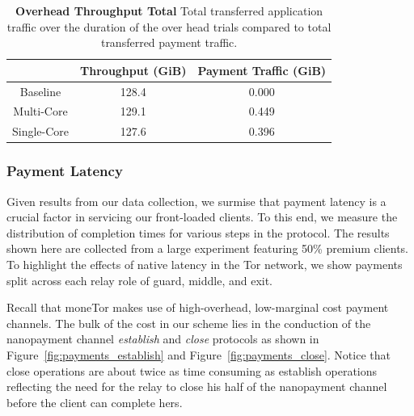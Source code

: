 \begin{table}
  \caption[Overhead Throughput Total]{\textbf{Overhead Throughput Total} Total
    transferred application traffic over the duration of the over head trials
    compared to total transferred payment traffic.}
  \begin{center}
    \begin{tabular}{ c c c }
      & Throughput (GiB) & Payment Traffic (GiB) \\ \hline
      Baseline & 128.4 & 0.000 \\
      Multi-Core & 129.1 & 0.449 \\
      Single-Core & 127.6 & 0.396
    \end{tabular}
  \end{center}
  \label{tab:overhead}
\end{table}

\subsubsection{Payment Latency}

Given results from our data collection, we surmise that payment
latency is a crucial factor in servicing our front-loaded clients. To this end,
we measure the distribution of completion times for various steps in the
protocol. The results shown here are collected from a large experiment featuring
50\% premium clients. To highlight the effects of native latency in the Tor
network, we show payments split across each relay role of guard, middle, and
exit.

Recall that moneTor makes use of high-overhead, low-marginal cost payment
channels. The bulk of the cost in our scheme lies in the conduction of the
nanopayment channel \emph{establish} and \emph{close} protocols as shown in
Figure~\ref{fig:payments_establish} and Figure~\ref{fig:payments_close}. Notice
that close operations are about twice as time consuming as establish operations
reflecting the need for the relay to close his half of the nanopayment channel
before the client can complete hers.


